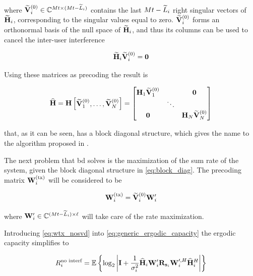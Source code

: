 \noindent
where $\mathbf{\widetilde{V}}_i^{(0)} \in \mathbb{C}^{Mt \times (Mt - \widetilde{L}_i)}$ contains the last
$Mt - \widetilde{L}_i$ right singular vectors of $\mathbf{\widetilde{H}}_i$, corresponding to the
singular values equal to zero. $\mathbf{\widetilde{V}}_i^{(0)}$ forms an orthonormal basis of
the null space of $\mathbf{\widetilde{H}}_i$, and thus its columns can be used to cancel the
inter-user interference

\begin{equation} \label{eq:v0_zero_interf}
    \mathbf{\widetilde{H}}_i \mathbf{\widetilde{V}}_i^{(0)} = \mathbf{0}
\end{equation}

Using these matrices as precoding the result is

\begin{equation} \label{eq:block_diag}
    \mathbf{\widehat{H}} = \mathbf{H} \begin{bmatrix}
        \mathbf{\widetilde{V}}_1^{(0)}, \ldots, \mathbf{\widetilde{V}}_N^{(0)}
    \end{bmatrix} = \begin{bmatrix}
        \mathbf{H}_1 \mathbf{\widetilde{V}}_1^{(0)} &        & \mathbf{0} \\
                              & \ddots & \\
        \mathbf{0}                 &        & \mathbf{H}_N \mathbf{\widetilde{V}}_N^{(0)}
    \end{bmatrix}
\end{equation}

\noindent
that, as it can be seen, has a block diagonal structure, which gives the name to
the algorithm proposed in \cite{spencer04}.

The next problem that \gls{bd} solves is the maximization of the sum rate of the
system, given the block diagonal structure in \eqref{eq:block_diag}. The
precoding matrix $\mathbf{W}^{(\text{tx})}_i$ will be considered to be

\begin{equation} \label{eq:wtx_nosvd}
    \mathbf{W}^{(\text{tx})}_i = \mathbf{\widetilde{V}}_i^{(0)} \mathbf{W}_i^{\prime}
\end{equation}

\noindent
where $\mathbf{W}_i^{\prime} \in \mathbb{C}^{(Mt - \widetilde{L}_i) \times \ell}$ will take care of
the rate maximization.

Introducing \eqref{eq:wtx_nosvd} into \eqref{eq:generic_ergodic_capacity} the
ergodic capacity simplifies to

\begin{equation} \label{eq:bd_ergodic_capacity_nosvd}
    R_i^{\text{no interf}} = \mathbb{E}\left\{
        \log_2\left| \mathbf{I} + \frac{1}{\sigma_i^2}\mathbf{\widehat{H}}_i\mathbf{W}_i^{\prime}
        \mathbf{R}_{\mathbf{s}_i} \mathbf{W}_i^{\prime,H}\mathbf{\widehat{H}}_i^H
    \right|
    \right\}
\end{equation}

